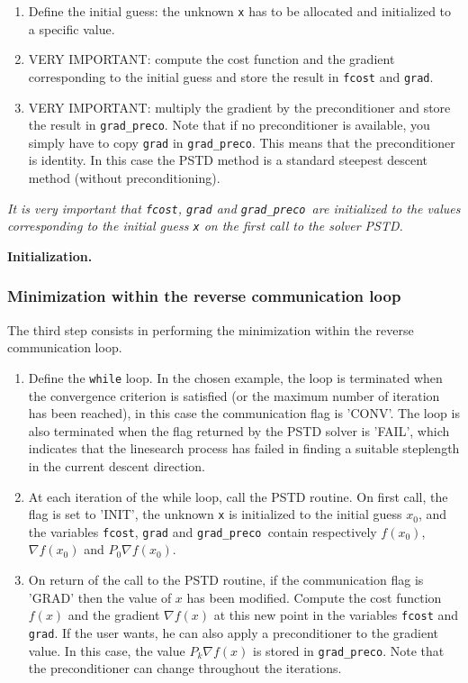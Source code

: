 \documentclass[a4paper,twoside,final,onecolumn,11pt,openright]{article}
\begin{document}
\begin{enumerate}
\item Define the initial guess: the unknown \texttt{x} has to be allocated and initialized to a specific value. 
\item VERY IMPORTANT: compute the cost function and the gradient corresponding to the initial guess and store the result in \texttt{fcost} and \texttt{grad}. 
\item VERY IMPORTANT: multiply the gradient by the preconditioner and store the result in \texttt{grad\_preco}. Note that if no preconditioner is available, you simply have to copy \texttt{grad} in \texttt{grad\_preco}. This means that the preconditioner is identity. In this case the PSTD method is a standard steepest descent method (without preconditioning). 
\end{enumerate}
\textit{It is very important that \texttt{fcost}, \texttt{grad} and \texttt{grad\_preco }are initialized to the values corresponding to the initial guess \texttt{x} on the first call to the solver PSTD.}

\framebox{
\small
 
}
\normalsize
\begin{center}
\textbf{Initialization.} 
\end{center}

\subsubsection{Minimization within the reverse communication loop}

The third step consists in performing the minimization within the reverse communication loop. 
\begin{enumerate}
 \item Define the \texttt{while} loop. In the chosen example, the loop is terminated when the convergence criterion is satisfied (or the maximum number of iteration has been reached), in this case the communication flag is 'CONV'. The loop is also terminated when the flag returned by the PSTD solver is 'FAIL', which indicates that the linesearch process has failed in finding a suitable steplength in the current descent direction. 
 \item At each iteration of the while loop, call the PSTD routine. On first call, the flag is set to 'INIT', the unknown \texttt{x} is initialized to the initial guess $x_0$, and the variables \texttt{fcost}, \texttt{grad} and \texttt{grad\_preco }contain respectively $f(x_0)$, $\nabla f(x_0)$ and $P_0\nabla f(x_0)$. 
\item On return of the call to the PSTD routine, if the communication flag is 'GRAD' then the value of $x$ has been modified. Compute the cost function $f(x)$ and the gradient $\nabla f(x)$ at this new point in the variables \texttt{fcost} and \texttt{grad}. If the user wants, he can also apply a preconditioner to the gradient value. In this case, the value $P_k \nabla f(x)$ is stored in \texttt{grad\_preco}. Note that the preconditioner can change throughout the iterations. 
\end{enumerate}
\end{document}

